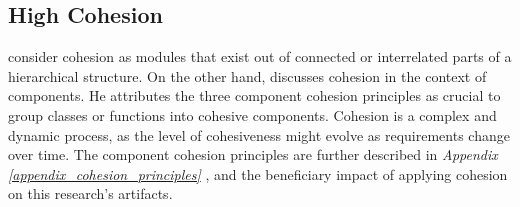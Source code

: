 \subsection{High Cohesion} \label{subsubsec_on_cohesion}

\textcite[22]{mannaert_normalized_2016} consider cohesion as modules that exist out of
connected or interrelated parts of a hierarchical structure. On the other hand,
\textcite[118]{robert_c_martin_clean_2018} discusses cohesion in the context of
components. He attributes the three component cohesion principles as crucial to group
classes or functions into cohesive components. Cohesion is a complex and dynamic process,
as the level of cohesiveness might evolve as requirements change over time. The component
cohesion principles are further described in \textit{Appendix
\ref{appendix_cohesion_principles} }, and the
beneficiary impact of applying cohesion on this research’s artifacts.